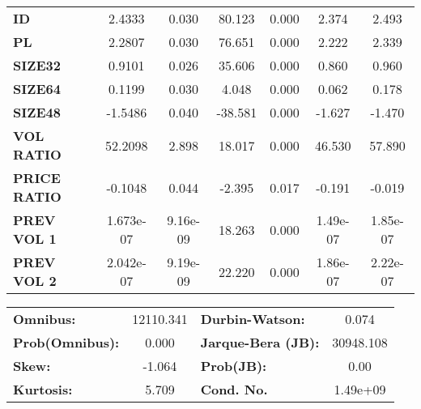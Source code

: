 \begin{center}
\begin{tabular}{lcccccc}
\textbf{ID}    &       2.4333  &        0.030     &    80.123  &         0.000        &        2.374    &        2.493     \\
\textbf{PL}    &       2.2807  &        0.030     &    76.651  &         0.000        &        2.222    &        2.339     \\
\textbf{SIZE32}    &       0.9101  &        0.026     &    35.606  &         0.000        &        0.860    &        0.960     \\
\textbf{SIZE64}   &       0.1199  &        0.030     &     4.048  &         0.000        &        0.062    &        0.178     \\
\textbf{SIZE48}   &      -1.5486  &        0.040     &   -38.581  &         0.000        &       -1.627    &       -1.470     \\
\textbf{VOL RATIO}   &      52.2098  &        2.898     &    18.017  &         0.000        &       46.530    &       57.890     \\
\textbf{PRICE RATIO}   &      -0.1048  &        0.044     &    -2.395  &         0.017        &       -0.191    &       -0.019     \\
\textbf{PREV VOL 1}   &    1.673e-07  &     9.16e-09     &    18.263  &         0.000        &     1.49e-07    &     1.85e-07     \\
\textbf{PREV VOL 2}   &    2.042e-07  &     9.19e-09     &    22.220  &         0.000        &     1.86e-07    &     2.22e-07     \\
\bottomrule
\end{tabular}
\begin{tabular}{lclc}
\textbf{Omnibus:}       & 12110.341 & \textbf{  Durbin-Watson:     } &     0.074  \\
\textbf{Prob(Omnibus):} &    0.000  & \textbf{  Jarque-Bera (JB):  } & 30948.108  \\
\textbf{Skew:}          &   -1.064  & \textbf{  Prob(JB):          } &      0.00  \\
\textbf{Kurtosis:}      &    5.709  & \textbf{  Cond. No.          } &  1.49e+09  \\
\bottomrule
\end{tabular}
\end{center}
